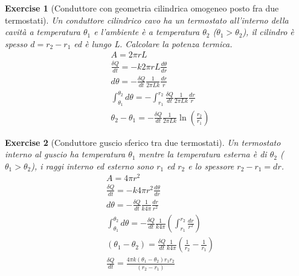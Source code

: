\documentclass[10pt,a4paper]{article}
\newtheorem{exercise}{Exercise}
\begin{document}
\begin{exercise}[Conduttore con geometria cilindrica omogeneo posto fra due termostati]
	Un conduttore cilindrico cavo ha un termostato all'interno della cavità a temperatura $\theta_1$ e l'ambiente è a temperatura $\theta_2$ ($\theta_1 > \theta_2$), il cilindro è spesso \(d = r_2-r_1\) ed è lungo L. Calcolare la potenza termica. 
	\begin{align*}
		&A = 2\pi r L\\
		&\frac{\delta Q}{dt} = -k 2 \pi r L \frac{d\theta}{d r}\\
		&d\theta = -\frac{\delta Q}{d t}\frac{1}{2\pi L k}\frac{dr}{r}\\
		&\int_{\theta_1}^{\theta_2} d\theta = - \int_{r_1}^{r_2}  \frac{\delta Q}{d t}\frac{1}{2\pi L k}\frac{dr}{r}\\
		&\theta_2 - \theta_1 = -\frac{\delta Q}{d t}\frac{1}{2\pi L k}\ln\left(\frac{r_2}{r_1}\right)
	\end{align*}
\end{exercise}
\begin{exercise}[Conduttore guscio sferico tra due termostati]
	Un termostato interno al guscio ha temperatura $\theta_1$ mentre la temperatura esterna è di $\theta_2$ (\(\theta_1 > \theta_2\)), i raggi interno ed esterno sono $r_1$ ed $r_2$ e lo spessore \(r_2-r_1 = dr\).
	\begin{align*}
		&A = 4 \pi r^2\\
		&\frac{\delta Q }{dt} = -k 4\pi r^2 \frac{d\theta}{dr}\\
		&d \theta = -\frac{\delta Q }{dt} \frac{1}{k 4 \pi}\frac{dr}{r^2}\\
		&\int_{\theta_1}^{\theta_2}d\theta = -\frac{\delta Q }{dt} \frac{1}{k 4 \pi} \left(\int_{r_1}^{r_2}\frac{dr}{r^2}\right)\\
		&(\theta_1 - \theta_2) = \frac{\delta Q }{dt} \frac{1}{k 4 \pi}\left(\frac{1}{r_2}-\frac{1}{r_1}\right)\\
		&\frac{\delta Q }{dt} = \frac{4\pi k (\theta_1-\theta_2)r_1 r_2}{(r_2 - r_1)}
	\end{align*}
\end{exercise}
\end{document}
